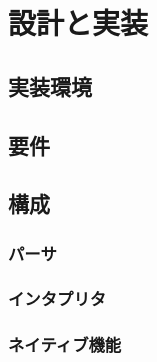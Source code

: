 \chapter{設計と実装}
\label{chap:implementation}

\section{実装環境}

\section{要件}

\section{構成}

\subsection{パーサ}

\subsection{インタプリタ}

\subsection{ネイティブ機能}
